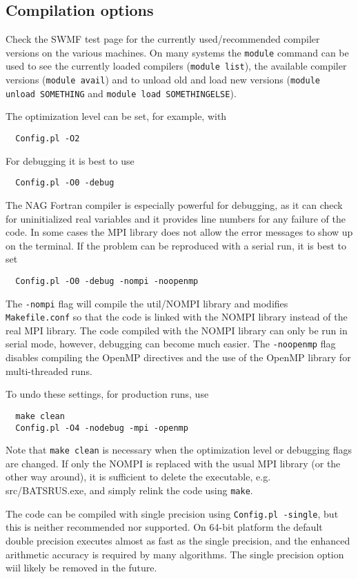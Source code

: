 \subsection{Compilation options}

Check the SWMF test page for the currently used/recommended 
compiler versions on the various machines. On many systems the
{\tt module} command can be used to see the currently loaded
compilers ({\tt module list}), the available compiler versions
({\tt module avail}) and to unload old and load new versions
({\tt module unload SOMETHING} and {\tt module load SOMETHINGELSE}).

The optimization level can be set, for example, with
\begin{verbatim}
  Config.pl -O2
\end{verbatim}
For debugging it is best to use
\begin{verbatim}
  Config.pl -O0 -debug
\end{verbatim}
The NAG Fortran compiler is especially powerful for debugging, 
as it can check for uninitialized real variables and it provides 
line numbers for any failure of the code.
In some cases the MPI library does not allow the error messages to show up
on the terminal. If the problem can be reproduced with a serial run, 
it is best to set
\begin{verbatim}
  Config.pl -O0 -debug -nompi -noopenmp
\end{verbatim}
The {\tt -nompi} flag will compile the util/NOMPI library and 
modifies {\tt Makefile.conf} so that the code is linked with
the NOMPI library instead of the real MPI library. 
The code compiled with the NOMPI library can only be
run in serial mode, however, debugging can become much easier.
The {\tt -noopenmp} flag disables compiling the OpenMP directives
and the use of the OpenMP library for multi-threaded runs.

To undo these settings, for production runs, use 
\begin{verbatim}
  make clean
  Config.pl -O4 -nodebug -mpi -openmp
\end{verbatim}
Note that {\tt make clean} is necessary when the optimization level 
or debugging flags are changed. If only the NOMPI is replaced with 
the usual MPI library (or the other way around), it is sufficient to
delete the executable, e.g. src/BATSRUS.exe, and simply relink the code
using {\tt make}.

The code can be compiled with single precision using {\tt Config.pl -single},
but this is neither recommended nor supported. On 64-bit platform the default
double precision executes almost as fast as the single precision, and the 
enhanced arithmetic accuracy is required by many algorithms.  
The single precision option wiil likely be removed in the future.

